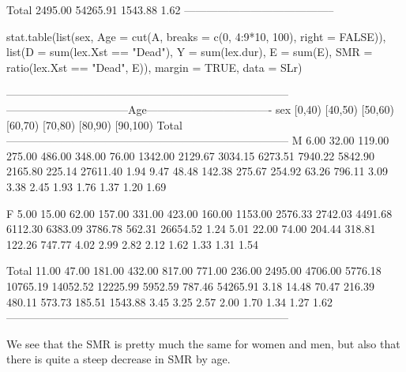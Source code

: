 \begin{enumerate}[resume]
\begin{Schunk}
\begin{Soutput}
 Total   2495.00 54265.91 1543.88    1.62  
 ----------------------------------------- 
\end{Soutput}
\begin{Sinput}
 stat.table(list(sex,
                 Age = cut(A,
                           breaks = c(0, 4:9*10, 100),
                           right = FALSE)),
            list(D = sum(lex.Xst == "Dead"),
                 Y = sum(lex.dur),
                 E = sum(E),
               SMR = ratio(lex.Xst == "Dead", E)),
            margin = TRUE,
              data = SLr)
\end{Sinput}
\begin{Soutput}
 ----------------------------------------------------------------------------- 
        ---------------------------------Age---------------------------------- 
 sex      [0,40) [40,50)  [50,60)  [60,70)  [70,80) [80,90) [90,100)    Total  
 ----------------------------------------------------------------------------- 
 M          6.00   32.00   119.00   275.00   486.00  348.00    76.00  1342.00  
         2129.67 3034.15  6273.51  7940.22  5842.90 2165.80   225.14 27611.40  
            1.94    9.47    48.48   142.38   275.67  254.92    63.26   796.11  
            3.09    3.38     2.45     1.93     1.76    1.37     1.20     1.69  
                                                                               
 F          5.00   15.00    62.00   157.00   331.00  423.00   160.00  1153.00  
         2576.33 2742.03  4491.68  6112.30  6383.09 3786.78   562.31 26654.52  
            1.24    5.01    22.00    74.00   204.44  318.81   122.26   747.77  
            4.02    2.99     2.82     2.12     1.62    1.33     1.31     1.54  
                                                                               
                                                                               
 Total     11.00   47.00   181.00   432.00   817.00  771.00   236.00  2495.00  
         4706.00 5776.18 10765.19 14052.52 12225.99 5952.59   787.46 54265.91  
            3.18   14.48    70.47   216.39   480.11  573.73   185.51  1543.88  
            3.45    3.25     2.57     2.00     1.70    1.34     1.27     1.62  
 ----------------------------------------------------------------------------- 
\end{Soutput}
\end{Schunk}
  We see that the SMR is pretty much the same for women and men, but
  also that there is quite a steep decrease in SMR by age.


\end{enumerate}
